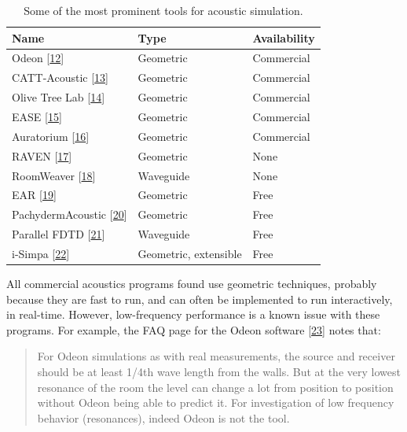 \documentclass[]{scrreprt}
\begin{document}
\begin{table}[ht]
\centering

\caption{Some of the most prominent tools for acoustic
simulation.\label{tab:software}}

\begin{tabular}{@{}lll@{}}
\toprule

Name & Type & Availability \\\midrule

Odeon
{[}\protect\hyperlink{ref-ux5fodeonux5f2016}{12}{]} & Geometric & Commercial \\
CATT-Acoustic
{[}\protect\hyperlink{ref-ux5fcatt-acousticux5f2016}{13}{]} & Geometric & Commercial \\
Olive Tree Lab
{[}\protect\hyperlink{ref-ux5fotlux5f2016}{14}{]} & Geometric & Commercial \\
EASE
{[}\protect\hyperlink{ref-ux5feaseux5f2016}{15}{]} & Geometric & Commercial \\
Auratorium
{[}\protect\hyperlink{ref-ux5faudiobornux5f2016}{16}{]} & Geometric & Commercial \\
RAVEN
{[}\protect\hyperlink{ref-schroderux5fraven:ux5f2011}{17}{]} & Geometric & None \\
RoomWeaver
{[}\protect\hyperlink{ref-beesonux5froomweaver:ux5f2004}{18}{]} & Waveguide & None \\
EAR
{[}\protect\hyperlink{ref-ux5fearux5f2016}{19}{]} & Geometric & Free \\
PachydermAcoustic
{[}\protect\hyperlink{ref-ux5fpachydermux5f2016}{20}{]} & Geometric & Free \\
Parallel FDTD
{[}\protect\hyperlink{ref-ux5fparallelfdtdux5f2016}{21}{]} & Waveguide & Free \\
i-Simpa
{[}\protect\hyperlink{ref-ux5fi-simpaux5f2016}{22}{]} & Geometric,
extensible & Free \\

\bottomrule
\end{tabular}

\end{table}

All commercial acoustics programs found use geometric techniques,
probably because they are fast to run, and can often be implemented to
run interactively, in real-time. However, low-frequency performance is a
known issue with these programs. For example, the FAQ page for the Odeon
software {[}\protect\hyperlink{ref-ux5fodeonux5f2016-1}{23}{]} notes
that:

\begin{quote}
For Odeon simulations as with real measurements, the source and receiver
should be at least 1/4th wave length from the walls. But at the very
lowest resonance of the room the level can change a lot from position to
position without Odeon being able to predict it. For investigation of
low frequency behavior (resonances), indeed Odeon is not the tool.
\end{quote}
\end{document}
